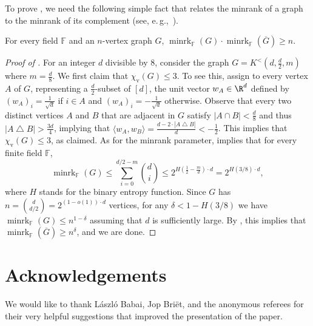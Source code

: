 \documentclass{toc}
\newcommand{\Fset}{\mathbb{F}}
\newcommand{\minrank}{\mathop{\mathrm{minrk}}}
\newcommand{\vchrom}{{\chi_\mathrm{v}}}
\newcommand\Kneser[3]{K^<(#1,#2,#3)}
\begin{document}
To prove , we need the following simple fact that relates the minrank of a graph to the minrank of its complement (see, e.\,g.,~\cite[Remark~2.2]{Peeters96}).

\begin{fact}\label{fact:minrank_comp}
For every field $\Fset$ and an $n$-vertex graph $G$, $\minrank_{\Fset}(G) \cdot \minrank_{\Fset}(\overline{G}) \geq n$.
\end{fact}

\begin{proof}[Proof of ]
For an integer $d$ divisible by $8$, consider the graph $G = \Kneser{d}{\frac{d}{2}}{m}$ where $m = \frac{d}{8}$.
We first claim that $\vchrom(G) \leq 3$.
To see this, assign to every vertex $A$ of $G$, representing a $\frac{d}{2}$-subset of $[d]$, the unit vector $w_A \in \R^d$ defined by $(w_A)_i = \frac{1}{\sqrt{d}}$ if $i \in A$ and $(w_A)_i = - \frac{1}{\sqrt{d}}$ otherwise.
Observe that every two distinct vertices $A$ and $B$ that are adjacent in $G$ satisfy $|A \cap B| < \frac{d}{8}$ and thus $|A \bigtriangleup B| > \frac{3d}{4}$, implying that $\langle w_A, w_B \rangle = \frac{d-2 \cdot |A \bigtriangleup B|}{d} < -\frac{1}{2}$. This implies that $\vchrom(G) \leq 3$, as claimed.
As for the minrank parameter,  implies that for every finite field $\Fset$,
\[{\minrank}_{\Fset}(G) \leq \sum_{i=0}^{d/2-m}\binom{d}{i} \leq 2^{H(\frac{1}{2}-\frac{m}{d}) \cdot d} = 2^{H(3/8) \cdot d},\]
where $H$ stands for the binary entropy function.
Since $G$ has $n = \binom{d}{d/2} = 2^{(1-o(1)) \cdot d}$ vertices, for any $\delta < 1- H(3/8)$ we have ${\minrank}_{\Fset}(G) \leq n^{1-\delta}$ assuming that $d$ is sufficiently large. By , this implies that
${\minrank}_{\Fset}(\overline{G}) \geq n^{\delta}$, and we are done.
\end{proof}

\section*{Acknowledgements}
%
%
We would like to thank L{\'{a}}szl{\'{o}} Babai, Jop Bri{\"{e}}t, and the anonymous referees for their very helpful suggestions that improved the presentation of the paper.


%
%
%
%

\end{document}
